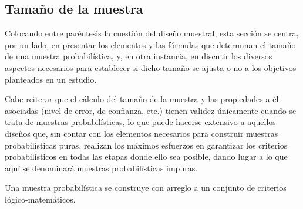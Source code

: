 \documentclass[
]{book}
\begin{document}
\hypertarget{tamauxf1o-de-la-muestra}{%
\subsection{Tamaño de la muestra}\label{tamauxf1o-de-la-muestra}}

Colocando entre paréntesis la cuestión del diseño muestral, esta sección se centra, por un lado, en presentar los elementos y las fórmulas que determinan el tamaño de una muestra probabilística, y, en otra instancia, en discutir los diversos aspectos necesarios para establecer si dicho tamaño se ajusta o no a los objetivos planteados en un estudio.

Cabe reiterar que el cálculo del tamaño de la muestra y las propiedades a él asociadas (nivel de error, de confianza, etc.) tienen validez únicamente cuando se trata de muestras probabilísticas, lo que puede hacerse extensivo a aquellos diseños que, sin contar con los elementos necesarios para construir muestras probabilísticas puras, realizan los máximos esfuerzos en garantizar los criterios probabilísticos en todas las etapas donde ello sea posible, dando lugar a lo que aquí se denominará muestras probabilísticas impuras.

Una muestra probabilística se construye con arreglo a un conjunto de criterios lógico-matemáticos.
\end{document}
